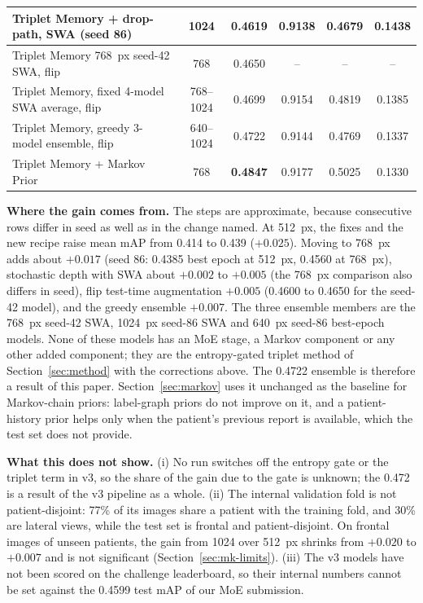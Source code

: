\documentclass[conference]{IEEEtran}
\begin{document}
\begin{table}[htbp]
\begin{center}
{\begin{tabular}{|l|c|c|c|c|c|}
Triplet Memory + drop-path, SWA (seed 86) & 1024 & 0.4619 & 0.9138 & 0.4679 & 0.1438 \\
\hline
Triplet Memory 768~px seed-42 SWA, flip & 768 & 0.4650 & -- & -- & -- \\
Triplet Memory, fixed 4-model SWA average, flip & 768--1024 & 0.4699 & 0.9154 & 0.4819 & 0.1385 \\
Triplet Memory, greedy 3-model ensemble, flip & 640--1024 & 0.4722 & 0.9144 & 0.4769 & 0.1337 \\
\hline
Triplet Memory + Markov Prior & 768 & \textbf{0.4847} & 0.9177 & 0.5025 & 0.1330 \\
\hline
\end{tabular}%
}
\label{tab3}
\end{center}
\end{table}

\textbf{Where the gain comes from.} The steps are approximate, because consecutive rows differ in seed as well as in the change named. At 512~px, the fixes and the new recipe raise mean mAP from 0.414 to 0.439 ($+0.025$). Moving to 768~px adds about $+0.017$ (seed 86: 0.4385 best epoch at 512~px, 0.4560 at 768~px), stochastic depth with SWA about $+0.002$ to $+0.005$ (the 768~px comparison also differs in seed), flip test-time augmentation $+0.005$ (0.4600 to 0.4650 for the seed-42 model), and the greedy ensemble $+0.007$. The three ensemble members are the 768~px seed-42 SWA, 1024~px seed-86 SWA and 640~px seed-86 best-epoch models. None of these models has an MoE stage, a Markov component or any other added component; they are the entropy-gated triplet method of Section~\ref{sec:method} with the corrections above. The 0.4722 ensemble is therefore a result of this paper. Section~\ref{sec:markov} uses it unchanged as the baseline for Markov-chain priors: label-graph priors do not improve on it, and a patient-history prior helps only when the patient's previous report is available, which the test set does not provide.

\textbf{What this does not show.} (i) No run switches off the entropy gate or the triplet term in v3, so the share of the gain due to the gate is unknown; the 0.472 is a result of the v3 pipeline as a whole. (ii) The internal validation fold is not patient-disjoint: 77\% of its images share a patient with the training fold, and 30\% are lateral views, while the test set is frontal and patient-disjoint. On frontal images of unseen patients, the gain from 1024 over 512~px shrinks from $+0.020$ to $+0.007$ and is not significant (Section~\ref{sec:mk-limits}). (iii) The v3 models have not been scored on the challenge leaderboard, so their internal numbers cannot be set against the 0.4599 test mAP of our MoE submission.
\end{document}
